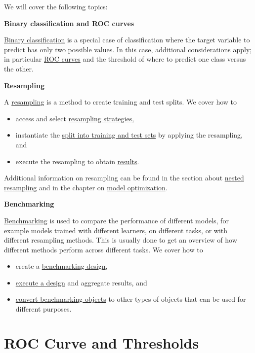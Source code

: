 \documentclass[
]{scrbook}
\providecommand{\tightlist}{%
  \setlength{\itemsep}{0pt}\setlength{\parskip}{0pt}}
\begin{document}
We will cover the following topics:

\textbf{Binary classification and ROC curves}

\protect\hyperlink{binary-classification}{Binary classification} is a special case of classification where the target variable to predict has only two possible values.
In this case, additional considerations apply; in particular \protect\hyperlink{binary-roc}{ROC curves} and the threshold of where to predict one class versus the other.

\textbf{Resampling}

A \protect\hyperlink{resampling}{resampling} is a method to create training and test splits.
We cover how to

\begin{itemize}
\tightlist
\item
  access and select \protect\hyperlink{resampling-settings}{resampling strategies},
\item
  instantiate the \protect\hyperlink{resampling-inst}{split into training and test sets} by applying the resampling, and
\item
  execute the resampling to obtain \protect\hyperlink{resampling-exec}{results}.
\end{itemize}

Additional information on resampling can be found in the section about \protect\hyperlink{nested-resampling}{nested resampling} and in the chapter on \protect\hyperlink{optimization}{model optimization}.

\textbf{Benchmarking}

\protect\hyperlink{benchmarking}{Benchmarking} is used to compare the performance of different models, for example models trained with different learners, on different tasks, or with different resampling methods.
This is usually done to get an overview of how different methods perform across different tasks.
We cover how to

\begin{itemize}
\tightlist
\item
  create a \protect\hyperlink{bm-design}{benchmarking design},
\item
  \protect\hyperlink{bm-exec}{execute a design} and aggregate results, and
\item
  \protect\hyperlink{bm-resamp}{convert benchmarking objects} to other types of objects that can be used for different purposes.
\end{itemize}

\hypertarget{binary-roc}{%
\section{ROC Curve and Thresholds}\label{binary-roc}}
\end{document}

